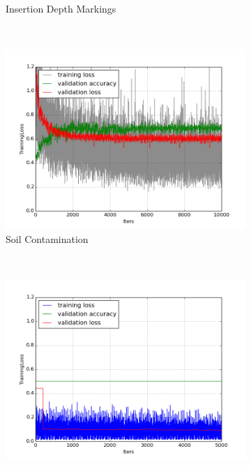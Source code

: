 \documentclass[a4paper,11pt]{article}
\begin{document}
\begin{figure}
\begin{subfigure}[b]{0.3\textwidth}
                \caption{Insertion Depth Markings}
                \label{fig:gull}
        \end{subfigure}%
        ~ %
        \begin{subfigure}[b]{0.3\textwidth}
                \includegraphics[width=\textwidth]{images/plot_soil_contam_none_lr5_sbl.png}
                \caption{Soil Contamination}
                \label{fig:tiger}
        \end{subfigure}
        ~ %
        \begin{subfigure}[b]{0.3\textwidth}
                \includegraphics[width=\textwidth]{images/plot_water_contam(fa).png}

\end{subfigure}
\end{figure}
\end{document}
